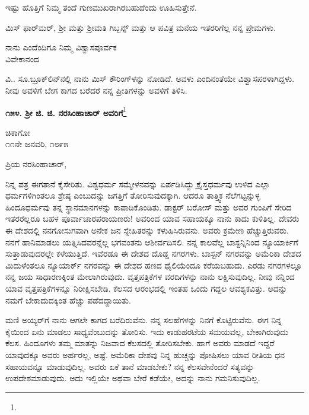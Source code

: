 ಇಷ್ಟು ಹೊತ್ತಿಗೆ ನಿಮ್ಮ ತಂದೆ ಗುಣಮುಖರಾಗಿರಬಹುದೆಂದು ಊಹಿಸುತ್ತೇನೆ.

ಮಿಸ್‌ ಫಾರ್‌ಮರ್, ಶ‍್ರೀ ಮತ್ತು ಶ‍್ರೀಮತಿ ಗಿಬ್ಬನ್ಸ್ ಮತ್ತು ಆ ಪವಿತ್ರ ಮನೆಯ ಇತರರಿಗೆಲ್ಲ ನನ್ನ ಪ್ರೇಮಗಳು.

\vspace{-0.5cm}

\begin{flushright}
ನಾನು ಎಂದೆಂದಿಗೂ ನಿಮ್ಮ ವಿಶ್ವಾಸಪೂರ್ವಕ\\ವಿವೇಕಾನಂದ
\end{flushright}

ವಿ.. ಸೂ.\enginline{-}ಬ್ರೂಕ್‌ಲಿನ್‌ನಲ್ಲಿ ನಾನು ಮಿಸ್ ಕೌರಿಂಗ್‌ಳನ್ನು ನೋಡಿದೆ. ಅವಳು ಎಂದಿನಂತೆಯೇ ವಿಶ್ವಾಸಪರಳಾಗಿದ್ದಳು. ನೀವು ಅವಳಿಗೆ ಬೇಗ ಕಾಗದ ಬರೆದರೆ ನನ್ನ ಪ್ರೀತಿಗಳನ್ನು ಅವಳಿಗೆ ತಿಳಿಸಿ.

\vspace{-0.2cm}

\begin{center}
\textbf{೧೫೪. ಶ‍್ರೀ ಜಿ. ಜಿ. ನರಸಿಂಹಾಚಾರ್ ಅವರಿಗೆ}\footnote{}
\end{center}

\vspace{-0.5cm}

\begin{flushright}
ಚಿಕಾಗೋ\\೧೧ನೇ ಜನವರಿ, ೧೮೯೫
\end{flushright}

\noindent
ಪ್ರಿಯ ನರಸಿಂಹಾಚಾರ್,

ನಿನ್ನ ಪತ್ರ ಈಗತಾನೆ ಕೈಸೇರಿತು. ವಿಶ್ವಧರ್ಮ ಸಮ್ಮೇಳನವನ್ನು ಏರ್ಪಡಿಸಿದ್ದು ಕ್ರೈಸ್ತಧರ್ಮವು ಉಳಿದ ಎಲ್ಲಾ ಧರ್ಮಗಳಿಗಿಂತಲೂ ಶ್ರೇಷ್ಠ ಎಂಬುದನ್ನು ಜಗತ್ತಿಗೆ ತೋರಿಸುವುದಕ್ಕಾಗಿ. ಆದರೂ ತಾತ್ತ್ವಿಕ ನೆಲೆಗಟ್ಟನ್ನುಳ್ಳ ಹಿಂದೂಧರ್ಮವು ತನ್ನ ಸ್ಥಾನಮಾನಗಳನ್ನು ಕಾಪಾಡಿಕೊಂಡಿತು. ಡಾಕ್ಟರ್ ಬರೋಸ್ ಮತ್ತು ಅವರ ಗುಂಪಿಗೆ ಸೇರಿದ ಇತರರೆಲ್ಲರೂ ಬಹಳ ಪೂರ್ವಾಚಾರಪರಾಯಣರು! ಅವರಿಂದ ಯಾವ ಸಹಾಯಕ್ಕೂ ನಾನು ಕಾದು ಕುಳಿತಿಲ್ಲ. ದೇವರು ಈ ದೇಶದಲ್ಲಿ ನನಗೋಸುಗವಾಗಿ ಅನೇಕ ಜನ ಸ್ನೇಹಿತರನ್ನು ಕಳುಹಿಸಿರುವನು. ಅವರು ಕ್ರಮೇಣ ಹೆಚ್ಚುತ್ತಿರುವರು. ನನಗೆ ಹಾನಿಮಾಡಲು ಯತ್ನಿಸಿದವರನ್ನೆಲ್ಲ ಭಗವಂತನು ಆಶೀರ್ವದಿಸಲಿ. ನನ್ನ ಕಾಲವೆಲ್ಲ ಬಾಸ್ಟನ್ನಿನಿಂದ ನ್ಯೂಯಾರ್ಕಿಗೆ ಸುತ್ತಾಡುವುದರಲ್ಲೇ ಕಳೆಯುತ್ತಿದೆ. ಇವೆರಡೂ ಈ ದೇಶದ ದೊಡ್ಡ ನಗರಗಳು. ಬಾಸ್ಟನ್ ನಗರವನ್ನು ಅಮೆರಿಕಾ ದೇಶದ ಮಿದುಳೆಂತಲೂ ನ್ಯೂಯಾರ್ಕ್ ನಗರವನ್ನು ಈ ದೇಶದ ಹಣದ ಥೈಲಿಯೆಂದೂ ಕರೆಯಬಹುದು. ಎರಡು ನಗರಗಳಲ್ಲೂ ನನ್ನ ಜಯ ಸಾಧಾರಣಕ್ಕಿಂತ ಮೇಲಾಗಿರುವುದು. ವೃತ್ತಪತ್ರಿಕೆಗಳ ವರದಿಗಳನ್ನು ನಾನು ಲಕ್ಷಿಸುವುದಿಲ್ಲ. ನೀವು ನನ್ನಿಂದ ಯಾವ ವೃತ್ತಪತ್ರಿಕೆಗಳನ್ನೂ ನಿರೀಕ್ಷಿಸಬೇಡಿ. ಕೆಲಸದ ಆರಂಭದಲ್ಲಿ ಇಂತಹ ಒಂದು ಗದ್ದಲ ಆವಶ್ಯಕವಿತ್ತು. ಅದನ್ನು ನಮಗೆ ಬೇಕಾದುದಕ್ಕಿಂತ ಹೆಚ್ಚು ಪಡೆದದ್ದಾಯಿತು.

ಮಣಿ ಅಯ್ಯರ್‌ಗೆ ನಾನು ಆಗಲೇ ಕಾಗದ ಬರೆದಿರುವೆನು. ನನ್ನ ಸಲಹೆಗಳನ್ನು ನಿನಗೆ ಕೊಟ್ಟಿರುವೆನು. ಈಗ ನಿನ್ನ ಕೈಯಿಂದ ಏನು ಮಾಡಲು ಸಾಧ್ಯವೆಂಬುದನ್ನು ತೋರಿಸು. ಇದು ಕಾಡುಹರಟೆಯ ಸಮಯವಲ್ಲ, ಬೇಕಾಗಿರುವುದು ಕೆಲಸ. ಹಿಂದೂಗಳು ತಮ್ಮ ಮಾತನ್ನು ನಿಜವಾದ ಕೆಲಸದಲ್ಲಿ ತೋರಿಸಬೇಕು. ಹಾಗೆ ಅವರು ಮಾಡದೆ ಇದ್ದರೆ ಯಾವುದಕ್ಕೂ ಅವರು ಅರ್ಹರಲ್ಲ, ಅಷ್ಟೆ. ಅಮೆರಿಕಾ ದೇಶವು ನಿನ್ನ ಹುಚ್ಚನ್ನು ಪೋಷಿಸಲು ಯಾವ ರೀತಿಯ ಧನ ಸಹಾಯವನ್ನೂ ಮಾಡುವುದಿಲ್ಲ. ಅವರು ಏಕೆ ತಾನೆ ಮಾಡಬೇಕು? ನನ್ನ ಕೆಲಸವೇನೆಂದರೆ ಸತ್ಯವನ್ನು ಉಪದೇಶಮಾಡುವುದು. ಅದು ಇಲ್ಲಿಯೇ ಅಥವಾ ಬೇರೆ ಕಡೆಯೇ, ಅದನ್ನು ನಾನು ಗಮನಿಸುವುದಿಲ್ಲ.


